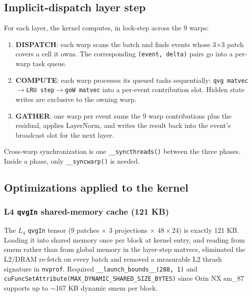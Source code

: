 \documentclass[11pt,a4paper]{article}
\begin{document}
\subsection{Implicit-dispatch layer step}

For each layer, the kernel computes, in lock-step across the 9 warps:

\begin{enumerate}[itemsep=0pt]
  \item \textbf{DISPATCH}: each warp scans the batch and finds events
        whose 3$\times$3 patch covers a cell it owns. The corresponding
        \texttt{(event, delta)} pairs go into a per-warp task queue.
  \item \textbf{COMPUTE}: each warp processes its queued tasks
        sequentially: \texttt{qvg matvec\(\to\)LRU step\(\to\)goW
        matvec} into a per-event contribution slot. Hidden state
        writes are exclusive to the owning warp.
  \item \textbf{GATHER}: one warp per event sums the 9 warp
        contributions plus the residual, applies LayerNorm, and writes
        the result back into the event's broadcast slot for the next
        layer.
\end{enumerate}

Cross-warp synchronization is one \texttt{\_\_syncthreads()} between
the three phases. Inside a phase, only \texttt{\_\_syncwarp()} is
needed.

\subsection{Optimizations applied to the kernel}

\subsubsection*{L4 \texttt{qvgIn} shared-memory cache (121 KB)}

The \(L_4\) \texttt{qvgIn} tensor (9 patches $\times$ 3 projections $\times$
$48 \times 24$) is exactly 121 KB. Loading it into shared memory once
per block at kernel entry, and reading from smem rather than from
global memory in the layer-step matvecs, eliminated the L2/DRAM
re-fetch on every batch and removed a measurable L2 thrash signature in
\texttt{nvprof}. Required \texttt{\_\_launch\_bounds\_\_(288, 1)} and
\texttt{cuFuncSetAttribute(MAX\_DYNAMIC\_SHARED\_SIZE\_BYTES)} since
Orin NX sm\_87 supports up to $\sim$167 KB dynamic smem per block.
\end{document}

